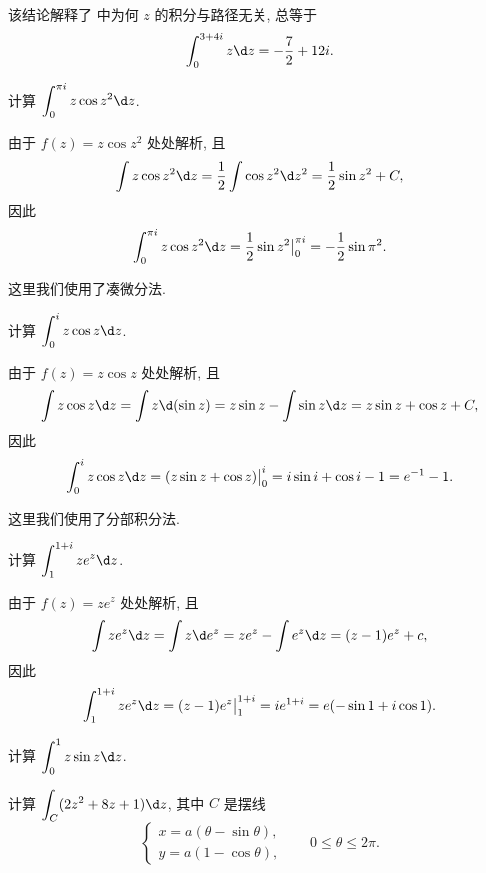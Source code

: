 该结论解释了 中为何 $z$ 的积分与路径无关, 总等于
\[
  \int_0^{3+4i}z\d z=-\frac72+12i.
\]

\begin{example}
  计算 $\displaystyle\int_0^{\pi i}z\cos z^2\d z$.
\end{example}

\begin{solution}
  由于 $f(z)=z\cos z^2$ 处处解析, 且
  \[\int z\cos z^2\d z=\half\int \cos z^2\d z^2=\half\sin z^2+C,\]
  因此
  \[\int_0^{\pi i}z\cos z^2\d z=\half\sin z^2\big|_0^{\pi i}=-\half\sin \pi^2.\]
\end{solution}

这里我们使用了\alert{凑微分法}.

\begin{example}
  计算 $\displaystyle\int_0^i z\cos z\d z$.
\end{example}

\begin{solution}
  由于 $f(z)=z\cos z$ 处处解析, 且
  \[
     \int z\cos z\d z
    =\int z\d(\sin z)
    =z\sin z-\int \sin z\d z
    =z\sin z+\cos z+C,
  \]
  因此
  \[
     \int_0^i z\cos z\d z
    =(z\sin z+\cos z)\big|_0^i
    =i\sin i+\cos i-1=e^{-1}-1.
  \]
\end{solution}

这里我们使用了\alert{分部积分法}.

\begin{example}
  计算 $\displaystyle\int_1^{1+i} z e^z\d z$.
\end{example}

\begin{solution}
  由于 $f(z)=ze^z$ 处处解析, 且
  \[
    \int z e^z\d z=\int z\d e^z=ze^z-\int e^z\d z=(z-1)e^z+c,
  \]
  因此
  \[
     \int_1^{1+i} z e^z\d z
    =(z-1)e^z\big|_1^{1+i}
    =ie^{1+i}
    =e(-\sin 1+i\cos 1).
  \]
\end{solution}

\begin{exercise}
  计算 $\displaystyle\int_0^1 z\sin z\d z$.
\end{exercise}

\begin{example}
  计算 $\displaystyle\int_C(2z^2+8z+1)\d z$, 其中 $C$ 是摆线
  \[
    \begin{cases}
      x=a(\theta-\sin\theta),& \\
      y=a(1-\cos\theta),&
    \end{cases}
    \quad 0\le \theta\le 2\pi.
  \]
\end{example}

